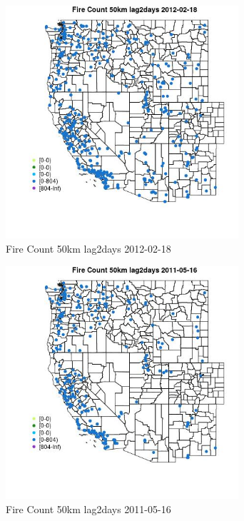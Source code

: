 \begin{figure} 
\centering  
\includegraphics[width=0.77\textwidth]{Code_Outputs/Report_ML_input_PM25_Step4_part_f_de_duplicated_aves_prioritize_24hr_obswNAs_MapObsFire_Count_50km_lag2days2012-02-18.jpg} 
\caption{\label{fig:Report_ML_input_PM25_Step4_part_f_de_duplicated_aves_prioritize_24hr_obswNAsMapObsFire_Count_50km_lag2days2012-02-18}Fire Count 50km lag2days 2012-02-18} 
\end{figure} 
 

\begin{figure} 
\centering  
\includegraphics[width=0.77\textwidth]{Code_Outputs/Report_ML_input_PM25_Step4_part_f_de_duplicated_aves_prioritize_24hr_obswNAs_MapObsFire_Count_50km_lag2days2011-05-16.jpg} 
\caption{\label{fig:Report_ML_input_PM25_Step4_part_f_de_duplicated_aves_prioritize_24hr_obswNAsMapObsFire_Count_50km_lag2days2011-05-16}Fire Count 50km lag2days 2011-05-16} 
\end{figure} 
 

